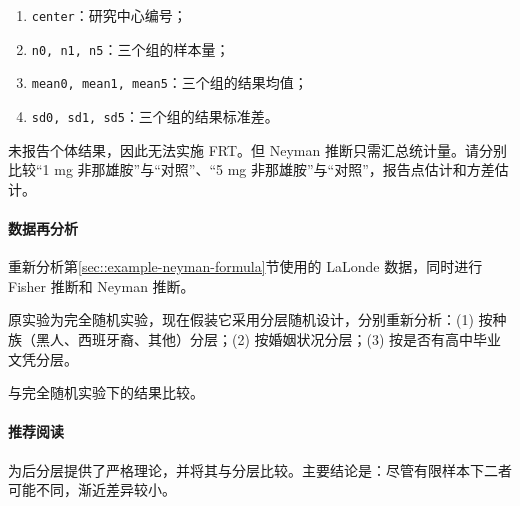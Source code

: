 \begin{enumerate}
\item
\texttt{center}：研究中心编号；
\item
\texttt{n0, n1, n5}：三个组的样本量；
\item
\texttt{mean0, mean1, mean5}：三个组的结果均值；
\item
\texttt{sd0, sd1, sd5}：三个组的结果标准差。 
\end{enumerate}

未报告个体结果，因此无法实施 FRT。但 Neyman 推断只需汇总统计量。请分别比较“1 mg 非那雄胺”与“对照”、“5 mg 非那雄胺”与“对照”，报告点估计和方差估计。 


\paragraph{数据再分析}
 
 
重新分析第\ref{sec::example-neyman-formula}节使用的 LaLonde 数据，同时进行 Fisher 推断和 Neyman 推断。 

原实验为完全随机实验，现在假装它采用分层随机设计，分别重新分析：(1) 按种族（黑人、西班牙裔、其他）分层；(2) 按婚姻状况分层；(3) 按是否有高中毕业文凭分层。 

与完全随机实验下的结果比较。 

 


\paragraph{推荐阅读}

\citet{miratrix:2013}为后分层提供了严格理论，并将其与分层比较。主要结论是：尽管有限样本下二者可能不同，渐近差异较小。 



